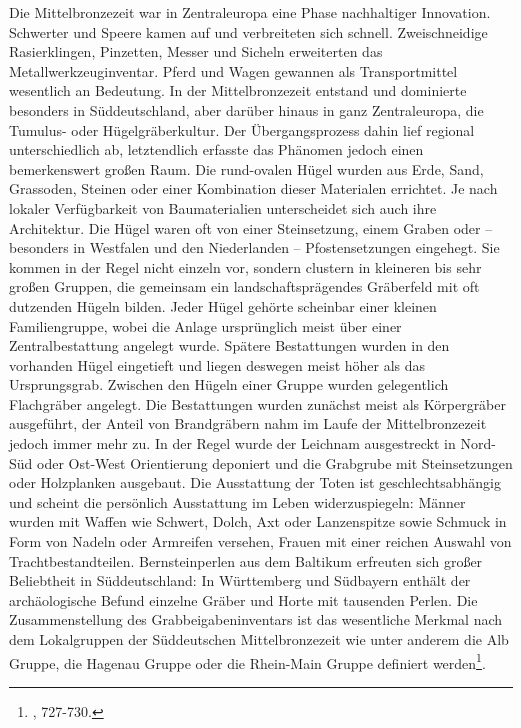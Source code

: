 \documentclass[openany,twoside,twocolumn]{book}
\let\rmarkdownfootnote\footnote%
\def\footnote{\protect\rmarkdownfootnote}
\begin{document}
Die Mittelbronzezeit war in Zentraleuropa eine Phase nachhaltiger
Innovation. Schwerter und Speere kamen auf und verbreiteten sich
schnell. Zweischneidige Rasierklingen, Pinzetten, Messer und Sicheln
erweiterten das Metallwerkzeuginventar. Pferd und Wagen gewannen als
Transportmittel wesentlich an Bedeutung. In der Mittelbronzezeit
entstand und dominierte besonders in Süddeutschland, aber darüber hinaus
in ganz Zentraleuropa, die Tumulus- oder Hügelgräberkultur. Der
Übergangsprozess dahin lief regional unterschiedlich ab, letztendlich
erfasste das Phänomen jedoch einen bemerkenswert großen Raum. Die
rund-ovalen Hügel wurden aus Erde, Sand, Grassoden, Steinen oder einer
Kombination dieser Materialen errichtet. Je nach lokaler Verfügbarkeit
von Baumaterialien unterscheidet sich auch ihre Architektur. Die Hügel
waren oft von einer Steinsetzung, einem Graben oder -- besonders in
Westfalen und den Niederlanden -- Pfostensetzungen eingehegt. Sie kommen
in der Regel nicht einzeln vor, sondern clustern in kleineren bis sehr
großen Gruppen, die gemeinsam ein landschaftsprägendes Gräberfeld mit
oft dutzenden Hügeln bilden. Jeder Hügel gehörte scheinbar einer kleinen
Familiengruppe, wobei die Anlage ursprünglich meist über einer
Zentralbestattung angelegt wurde. Spätere Bestattungen wurden in den
vorhanden Hügel eingetieft und liegen deswegen meist höher als das
Ursprungsgrab. Zwischen den Hügeln einer Gruppe wurden gelegentlich
Flachgräber angelegt. Die Bestattungen wurden zunächst meist als
Körpergräber ausgeführt, der Anteil von Brandgräbern nahm im Laufe der
Mittelbronzezeit jedoch immer mehr zu. In der Regel wurde der Leichnam
ausgestreckt in Nord-Süd oder Ost-West Orientierung deponiert und die
Grabgrube mit Steinsetzungen oder Holzplanken ausgebaut. Die Ausstattung
der Toten ist geschlechtsabhängig und scheint die persönlich Ausstattung
im Leben widerzuspiegeln: Männer wurden mit Waffen wie Schwert, Dolch,
Axt oder Lanzenspitze sowie Schmuck in Form von Nadeln oder Armreifen
versehen, Frauen mit einer reichen Auswahl von Trachtbestandteilen.
Bernsteinperlen aus dem Baltikum erfreuten sich großer Beliebtheit in
Süddeutschland: In Württemberg und Südbayern enthält der archäologische
Befund einzelne Gräber und Horte mit tausenden Perlen. Die
Zusammenstellung des Grabbeigabeninventars ist das wesentliche Merkmal
nach dem Lokalgruppen der Süddeutschen Mittelbronzezeit wie unter
anderem die Alb Gruppe, die Hagenau Gruppe oder die Rhein-Main Gruppe
definiert werden\footnote{\textcite{jockenhovel_germany_2013}, 727-730.}.
\end{document}
